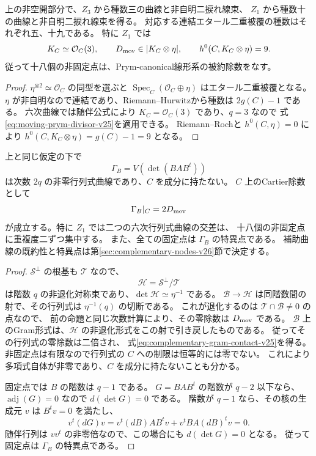 \begin{corollary}
\label{cor:gram-prym-canonical-v25}
上の非空開部分で、$Z_3$ から種数三の曲線と非自明二捩れ線束、
$Z_1$ から種数十の曲線と非自明二捩れ線束を得る。
対応する連結エタール二重被覆の種数はそれぞれ五、十九である。
特に $Z_1$ では
\[
 K_C\simeq\mathcal O_C(3),\qquad
 D_{\rm mov}\in|K_C\otimes\eta|,\qquad
 h^0(C,K_C\otimes\eta)=9.
\]
従って十八個の非固定点は、Prym-canonical線形系の被約除数をなす。
\end{corollary}

\begin{proof}
$\eta^{\otimes2}\simeq\mathcal O_C$ の同型を選ぶと
$\operatorname{Spec}_C(\mathcal O_C\oplus\eta)$ はエタール二重被覆となる。
$\eta$ が非自明なので連結であり、Riemann--Hurwitzから種数は $2g(C)-1$ である。
六次曲線では随伴公式により $K_C=\mathcal O_C(3)$ であり、$q=3$ なので
式\eqref{eq:moving-prym-divisor-v25}を適用できる。
Riemann--Rochと $h^0(C,\eta)=0$ により
$h^0(C,K_C\otimes\eta)=g(C)-1=9$ となる。
\end{proof}

\begin{proposition}[補助Gram曲線との二重交差]
\label{prop:complementary-gram-contact-v25}
上と同じ仮定の下で
\[
 \Gamma_B=V(\det(BAB^t))
\]
は次数 $2q$ の非零行列式曲線であり、$C$ を成分に持たない。
$C$ 上のCartier除数として
\begin{equation}\label{eq:complementary-gram-contact-v25}
 \Gamma_B|_C=2D_{\rm mov}
\end{equation}
が成立する。特に $Z_1$ では二つの六次行列式曲線の交差は、
十八個の非固定点に重複度二ずつ集中する。
また、全ての固定点は $\Gamma_B$ の特異点である。
補助曲線の既約性と特異点は第\ref{sec:complementary-nodes-v26}節で決定する。
\end{proposition}

\begin{proof}
$\mathcal S^\perp$ の根基も $\mathcal T$ なので、
\[
 \mathcal H=\mathcal S^\perp/\mathcal T
\]
は階数 $q$ の非退化対称束であり、$\det\mathcal H\simeq\eta^{-1}$ である。
$\mathcal B\to\mathcal H$ は同階数間の射で、その行列式は
$\eta^{-1}(q)$ の切断である。
これが退化するのは $\mathcal T\cap\mathcal B\ne0$ の点なので、
前の命題と同じ次数計算により、その零除数は $D_{\rm mov}$ である。
$\mathcal B$ 上のGram形式は、$\mathcal H$ の非退化形式をこの射で引き戻したものである。
従ってその行列式の零除数は二倍され、
式\eqref{eq:complementary-gram-contact-v25}を得る。
非固定点は有限なので行列式の $C$ への制限は恒等的には零でない。
これにより多項式自体が非零であり、$C$ を成分に持たないことも分かる。

固定点では $B$ の階数は $q-1$ である。
$G=BAB^t$ の階数が $q-2$ 以下なら、$\operatorname{adj}(G)=0$ なので
$d(\det G)=0$ である。
階数が $q-1$ なら、その核の生成元 $v$ は $B^tv=0$ を満たし、
\[
 v^t(dG)v=v^t(dB)AB^tv+v^tBA(dB)^tv=0.
\]
随伴行列は $vv^t$ の非零倍なので、この場合にも $d(\det G)=0$ となる。
従って固定点は $\Gamma_B$ の特異点である。
\end{proof}

